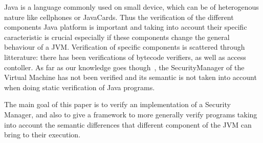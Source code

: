 Java is a language commonly used on small device, which can be of
heterogenous nature like cellphones or JavaCards. Thus the
verification of the different components Java platform is important
and taking into account their specific caracteristic is crucial
especially if these components change the general behaviour of a
JVM. Verification of specific components is scattered through
litterature: there has been verifications of bytecode verifiers, as
well as access contoller. As far as our knowledge goes
though~\cite{HartelMoreau01}, the SecurityManager of the Virtual
Machine has not been verified and its semantic is not taken into
account when doing static verification of Java programs.


The main goal of this paper is to verify an implementation of a
Security Manager, and also to give a framework to more generally verify
programs taking into account the semantic differences that different
component of the JVM can bring to their execution.


